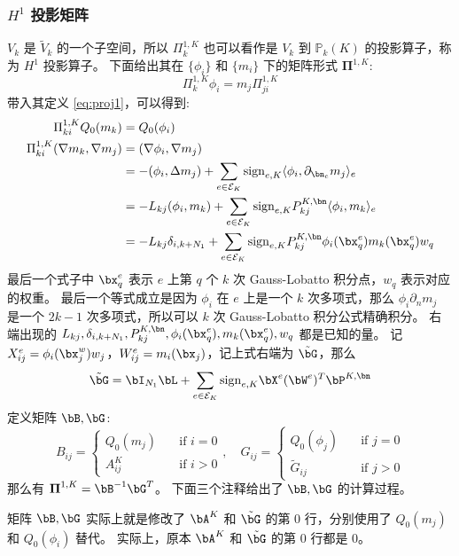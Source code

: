 \subsubsection{$H^1$ 投影矩阵}
$V_k$ 是 $\tilde{V}_k$ 的一个子空间，所以 $\Pi_k^{1, K}$ 也可以看作是 $V_k$ 到
$\mathbb{P}_k(K)$ 的投影算子，称为 $H^1$ 投影算子。
下面给出其在 $\{\phi_i\}$ 和 $\{m_{i}\}$ 下的矩阵形式 $\boldsymbol{\Pi}^{1, K}$:
$$
\Pi_k^{1, K} \phi_i = m_j \Pi^{1, K}_{ji}
$$
带入其定义 \eqref{eq:proj1}，可以得到:
$$
\begin{aligned}
\Pi^{1, K}_{ki}Q_0(m_k) & = Q_0(\phi_i)\\
\Pi^{1, K}_{ki} (\nabla m_k, \nabla m_j) & = (\nabla \phi_i, \nabla m_j)\\
& = -(\phi_i, \Delta m_j) + \sum_{e \in \mathcal{E}_K}\mathrm{sign}_{e, K}\langle \phi_i,
\partial_{\bn_e} m_j \rangle_e\\
& = -L_{kj}(\phi_i, m_k) + \sum_{e \in \mathcal{E}_K}\mathrm{sign}_{e,
K}P^{K, \bn}_{kj}\langle \phi_i, m_k \rangle_e\\
& = -L_{kj}\delta_{i, k+N_1} + \sum_{e \in \mathcal{E}_K}\mathrm{sign}_{e,
K}P^{K, \bn}_{kj} \phi_i(\bx_q^e) m_k(\bx_q^e)w_q\\
\end{aligned}
$$
最后一个式子中 $\bx_q^e$ 表示 $e$ 上第 $q$ 个
$k$ 次 Gauss-Lobatto 积分点，$w_q$ 表示对应的权重。
最后一个等式成立是因为 $\phi_i$ 在 $e$ 上是一个 $k$ 次多项式，那么 $\phi_i
\partial_n m_j$ 是一个 $2k-1$ 次多项式，所以可以 $k$ 次 Gauss-Lobatto
积分公式精确积分。
右端出现的 $L_{kj}, \delta_{i, k+N_1}, 
P^{K, \bn}_{kj}, \phi_i(\bx_q^e), m_k(\bx_q^e), w_q$ 都是已知的量。
记 $X_{ij}^e = \phi_i(\bx_j^w)w_j$，$W_{ij}^e = m_i(\bx_j)$，记上式右端为
$\tilde{\bG}$，那么 
$$
\tilde{\bG} = \bI_{N_1}\bL +
\sum_{e\in\mathcal{E}_K} \mathrm{sign}_{e, K} \bX^e (\bW^{e})^T\bP^{K, \bn} 
$$
定义矩阵 $\bB, \bG$:
$$
B_{ij} = \begin{cases}
    Q_0(m_j) & \quad \text{if $i = 0$}\\
    A_{ij}^K & \quad \text{if $i > 0$}
\end{cases},\quad 
G_{ij} = \begin{cases}
    Q_0(\phi_j) & \quad \text{if $j = 0$}\\
    \tilde{G}_{ij} & \quad \text{if $j > 0$}
\end{cases}
$$
那么有 $\boldsymbol{\Pi}^{1, K} = \bB^{-1}\bG^{T}$。 
下面三个注释给出了 $\bB, \bG$ 的计算过程。
\begin{remark}
矩阵 $\bB, \bG$ 实际上就是修改了 $\bA^K$ 和 $\tilde{\bG}$ 的第 $0$
行，分别使用了 $Q_0(m_j)$ 和 $Q_0(\phi_i)$ 替代。
实际上，原本 $\bA^K$ 和 $\tilde{\bG}$ 的第 $0$ 行都是 0。
\end{remark}
